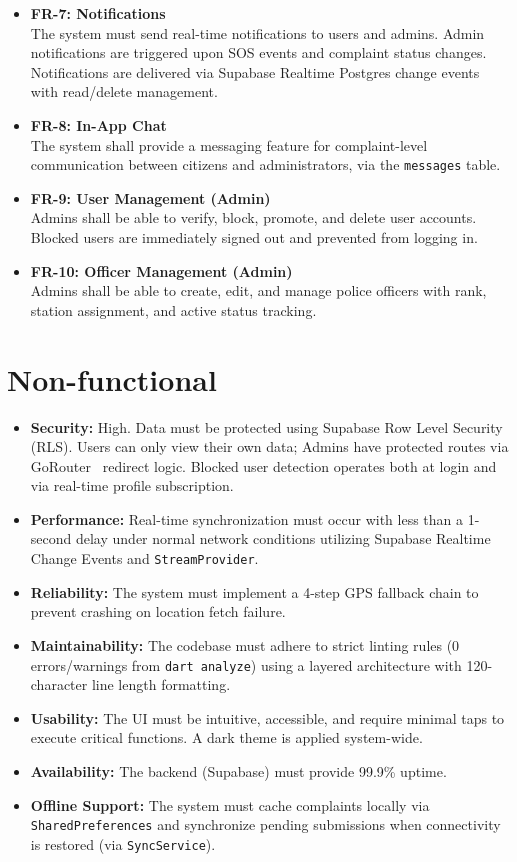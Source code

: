 \documentclass[12pt, a4paper, twoside]{report}
\begin{document}
\begin{itemize}[label={}, itemsep=1em]
    \item \textbf{FR-7: Notifications}\\
    The system must send real-time notifications to users and admins. Admin notifications are triggered upon SOS events and complaint status changes. Notifications are delivered via Supabase Realtime Postgres change events with read/delete management.
    \item \textbf{FR-8: In-App Chat}\\
    The system shall provide a messaging feature for complaint-level communication between citizens and administrators, via the \texttt{messages} table.
    \item \textbf{FR-9: User Management (Admin)}\\
    Admins shall be able to verify, block, promote, and delete user accounts. Blocked users are immediately signed out and prevented from logging in.
    \item \textbf{FR-10: Officer Management (Admin)}\\
    Admins shall be able to create, edit, and manage police officers with rank, station assignment, and active status tracking.
\end{itemize}
\section{Non-functional}
\begin{itemize}[label={}, itemsep=1em]
    \item \textbf{Security:} High. Data must be protected using Supabase Row Level Security (RLS). Users can only view their own data; Admins have protected routes via GoRouter~\cite{gorouter} redirect logic. Blocked user detection operates both at login and via real-time profile subscription.
    \item \textbf{Performance:} Real-time synchronization must occur with less than a 1-second delay under normal network conditions utilizing Supabase Realtime Change Events and \texttt{StreamProvider}.
    \item \textbf{Reliability:} The system must implement a 4-step GPS fallback chain to prevent crashing on location fetch failure.
    \item \textbf{Maintainability:} The codebase must adhere to strict linting rules (0 errors/warnings from \texttt{dart analyze}) using a layered architecture with 120-character line length formatting.
    \item \textbf{Usability:} The UI must be intuitive, accessible, and require minimal taps to execute critical functions. A dark theme is applied system-wide.
    \item \textbf{Availability:} The backend (Supabase) must provide 99.9\% uptime.
    \item \textbf{Offline Support:} The system must cache complaints locally via \texttt{SharedPreferences} and synchronize pending submissions when connectivity is restored (via \texttt{SyncService}).
\end{itemize}
\end{document}
